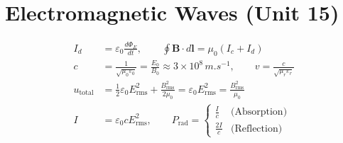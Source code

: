 \documentclass[10pt,twoside,openright]{book}
\begin{document}
\section{Electromagnetic Waves (Unit 15)}

\begin{formulabox}
\begin{align}
  I_d &= \varepsilon_0 \frac{d\Phi_E}{dt}, \qquad \oint \mathbf{B}\cdot d\mathbf{l} = \mu_0\left(I_c + I_d\right) \\
  c &= \frac{1}{\sqrt{\mu_0\varepsilon_0}} = \frac{E_0}{B_0} \approx 3\times 10^8\,\si{m.s^{-1}}, \qquad v = \frac{c}{\sqrt{\mu_r \varepsilon_r}} \\
  u_{\text{total}} &= \frac{1}{2}\varepsilon_0 E_{\text{rms}}^2 + \frac{B_{\text{rms}}^2}{2\mu_0} = \varepsilon_0 E_{\text{rms}}^2 = \frac{B_{\text{rms}}^2}{\mu_0} \\
  I &= \varepsilon_0 c E_{\text{rms}}^2, \qquad P_{\text{rad}} = \begin{cases} \frac{I}{c} & \text{(Absorption)} \\ \frac{2I}{c} & \text{(Reflection)} \end{cases}
\end{align}
\end{formulabox}
\end{document}
